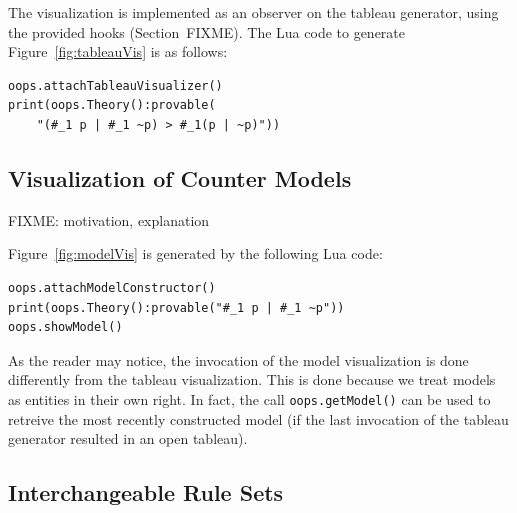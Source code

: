 The visualization is implemented as an observer on the tableau generator,
using the provided hooks (Section~FIXME). The Lua code to generate
Figure~\ref{fig:tableauVis} is as follows:

\lstset{language=lua, basicstyle=\small, stringstyle=\upshape,
stringstyle=\ttfamily, showstringspaces=false, tabsize=4}
\begin{lstlisting}
oops.attachTableauVisualizer()
print(oops.Theory():provable(
	"(#_1 p | #_1 ~p) > #_1(p | ~p)"))
\end{lstlisting}

\subsection{Visualization of Counter Models}

FIXME: motivation, explanation

Figure~\ref{fig:modelVis} is generated by the following Lua code:
\begin{lstlisting}
oops.attachModelConstructor()
print(oops.Theory():provable("#_1 p | #_1 ~p"))
oops.showModel() 
\end{lstlisting}
As the reader may notice, the invocation of the model visualization is done
differently from the tableau visualization. This is done because we treat
models as entities in their own right. In fact, the call
\lstinline!oops.getModel()!  can be used to retreive the most recently
constructed model (if the last invocation of the tableau generator resulted in
an open tableau).

\subsection{Interchangeable Rule Sets}

